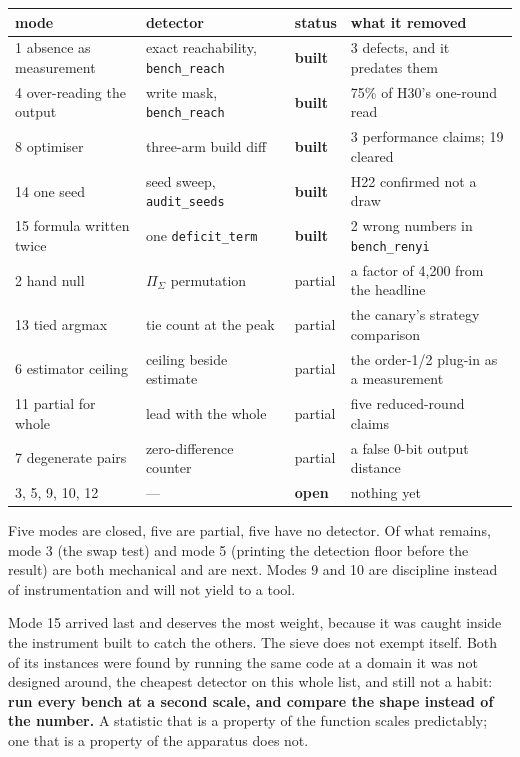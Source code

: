 \begin{center}
\begin{tabular}{@{}llll@{}}
\toprule
mode & detector & status & what it removed \\
\midrule
1 absence as measurement & exact reachability, \texttt{bench\_reach} & \textbf{built} & 3 defects, and it predates them \\
4 over-reading the output & write mask, \texttt{bench\_reach} & \textbf{built} & 75\% of H30's one-round read \\
8 optimiser & three-arm build diff & \textbf{built} & 3 performance claims; 19 cleared \\
14 one seed & seed sweep, \texttt{audit\_seeds} & \textbf{built} & H22 confirmed not a draw \\
15 formula written twice & one \texttt{deficit\_term} & \textbf{built} & 2 wrong numbers in \texttt{bench\_renyi} \\
2 hand null & \(\Pi_\Sigma\) permutation & partial & a factor of 4,200 from the headline \\
13 tied argmax & tie count at the peak & partial & the canary's strategy comparison \\
6 estimator ceiling & ceiling beside estimate & partial & the order-1/2 plug-in as a measurement \\
11 partial for whole & lead with the whole & partial & five reduced-round claims \\
7 degenerate pairs & zero-difference counter & partial & a false 0-bit output distance \\
3, 5, 9, 10, 12 & --- & \textbf{open} & nothing yet \\
\bottomrule
\end{tabular}
\end{center}

Five modes are closed, five are partial, five have no detector. Of what remains, mode 3 (the swap test) and mode 5 (printing the detection floor before the result) are both mechanical and are next. Modes 9 and 10 are discipline instead of instrumentation and will not yield to a tool.

Mode 15 arrived last and deserves the most weight, because it was caught inside the instrument built to catch the others. The sieve does not exempt itself. Both of its instances were found by running the same code at a domain it was not designed around, the cheapest detector on this whole list, and still not a habit: \textbf{run every bench at a second scale, and compare the shape instead of the number.} A statistic that is a property of the function scales predictably; one that is a property of the apparatus does not.
